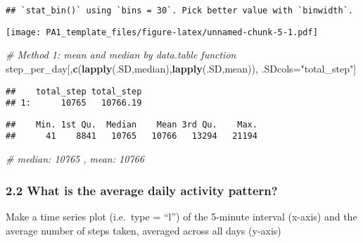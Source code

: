 \documentclass[
]{article}
\newenvironment{Shaded}{\begin{snugshade}}{\end{snugshade}}
\newcommand{\CommentTok}[1]{\textcolor[rgb]{0.56,0.35,0.01}{\textit{#1}}}
\newcommand{\KeywordTok}[1]{\textcolor[rgb]{0.13,0.29,0.53}{\textbf{#1}}}
\newcommand{\NormalTok}[1]{#1}
\newcommand{\OperatorTok}[1]{\textcolor[rgb]{0.81,0.36,0.00}{\textbf{#1}}}
\newcommand{\StringTok}[1]{\textcolor[rgb]{0.31,0.60,0.02}{#1}}
\begin{document}
\begin{verbatim}
## `stat_bin()` using `bins = 30`. Pick better value with `binwidth`.
\end{verbatim}

\texttt{[image: PA1\_template\_files/figure-latex/unnamed-chunk-5-1.pdf]}

\begin{Shaded}
\begin{Highlighting}[]
\CommentTok{# Method 1: mean and median by data.table function}
\NormalTok{step_per_day[,}\KeywordTok{c}\NormalTok{(}\KeywordTok{lapply}\NormalTok{(.SD,median),}\KeywordTok{lapply}\NormalTok{(.SD,mean)), .SDcols=}\StringTok{"total_step"}\NormalTok{]}
\end{Highlighting}
\end{Shaded}

\begin{verbatim}
##    total_step total_step
## 1:      10765   10766.19
\end{verbatim}

\begin{Shaded}
\end{Shaded}

\begin{verbatim}
##    Min. 1st Qu.  Median    Mean 3rd Qu.    Max. 
##      41    8841   10765   10766   13294   21194
\end{verbatim}

\begin{Shaded}
\begin{Highlighting}[]
\CommentTok{# median: 10765 , mean: 10766}
\end{Highlighting}
\end{Shaded}

\hypertarget{what-is-the-average-daily-activity-pattern}{%
\subsubsection{2.2 What is the average daily activity
pattern?}\label{what-is-the-average-daily-activity-pattern}}

Make a time series plot (i.e.~\color{red}{\verb|type = "l"|}type =
``l'') of the 5-minute interval (x-axis) and the average number of steps
taken, averaged across all days (y-axis)
\end{document}

